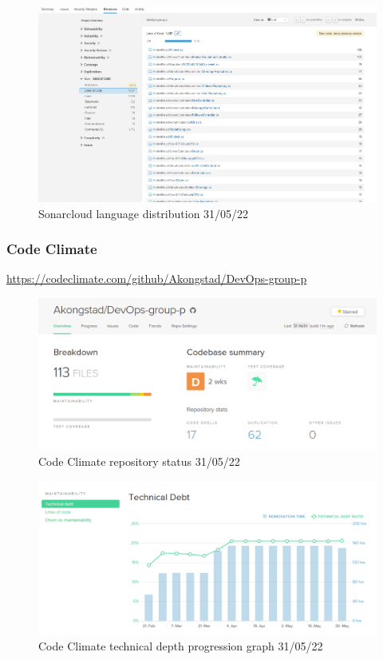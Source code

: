 \begin {figure}[H]
    \centering
    \includegraphics[scale=0.39]{images/analysis_tools/SonarCloudCsharp.PNG}
    \caption{Sonarcloud language distribution 31/05/22}
    \label{fig:cloudLangDis}
\end{figure}

\subsubsection{Code Climate}
\label{app:codeClimate}
\href{https://codeclimate.com/github/Akongstad/DevOps-group-p}{https://codeclimate.com/github/Akongstad/DevOps-group-p}

\begin {figure}[H]
    \centering
    \includegraphics[scale=0.50]{images/analysis_tools/codeClimateDash.PNG}
    \caption{Code Climate repository status 31/05/22}
    \label{fig:codeClimateDash}
\end{figure}

\begin {figure}[H]
    \centering
    \includegraphics[scale=0.50]{images/analysis_tools/codeClimateTechDebt.PNG}
    \caption{Code Climate technical depth progression graph 31/05/22}
    \label{fig:codeClimateDepth}
\end{figure}

